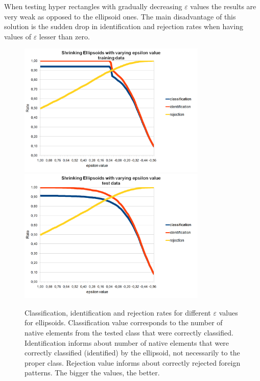 When testing hyper rectangles with gradually decreasing $\varepsilon$ values the results are very weak as opposed to the ellipsoid ones. The main disadvantage of this solution is the sudden drop in identification and rejection rates when having values of $\varepsilon$ lesser than zero.

\begin{figure}[htp]
	\centering
	\includegraphics[width=0.80\textwidth]{Figures/charts/DIGITS/DIGITS_ShrinkingEllipsoidsToleranceTraining.png}
	\hspace{12pt}
	\includegraphics[width=0.80\textwidth]{Figures/charts/DIGITS/DIGITS_ShrinkingEllipsoidsToleranceTest.png}
	\caption{ Classification, identification and rejection rates for different $\varepsilon$ values for ellipsoids. Classification value corresponds to the number of native elements from the tested class that were correctly classified. Identification informs about number of native elements that were correctly classified (identified) by the ellipsoid, not necessarily to the proper class. Rejection value informs about correctly rejected foreign patterns. The bigger the values, the better. }
	\label{fig:shrinking_ellipsoids_tolerance_manipulation}\vspace{-3pt}
\end{figure}

